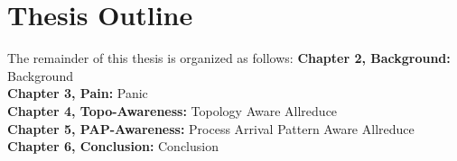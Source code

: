 \section[Outline]{Thesis Outline}
The remainder of this thesis is organized as follows:
\noindent\textbf{Chapter 2, Background:} Background\\
\noindent\textbf{Chapter 3, Pain:} Panic\\
\noindent\textbf{Chapter 4, Topo-Awareness:} Topology Aware Allreduce\\
\noindent\textbf{Chapter 5, PAP-Awareness:} Process Arrival Pattern Aware Allreduce\\
\noindent\textbf{Chapter 6, Conclusion:} Conclusion
